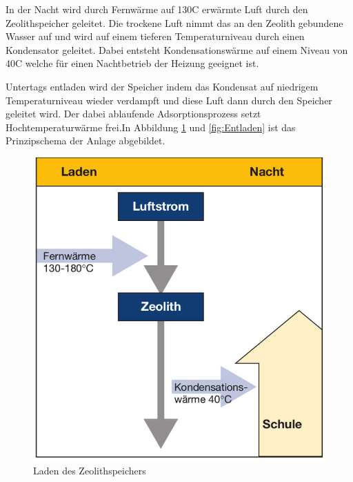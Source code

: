 \documentclass[11pt,a4paper]{scrartcl}
\begin{document}
In der Nacht wird durch Fernwärme auf 130\textdegree C erwärmte Luft durch den
Zeolithspeicher geleitet. Die trockene Luft nimmt das an den Zeolith gebundene
Wasser auf und wird auf einem tieferen Temperaturniveau durch einen Kondensator
geleitet. Dabei entsteht Kondensationswärme auf einem Niveau von 40\textdegree C
welche für einen Nachtbetrieb der Heizung geeignet ist. 

Untertags entladen wird der Speicher indem das Kondensat auf niedrigem
Temperaturniveau wieder verdampft und diese Luft dann durch den Speicher
geleitet wird. Der dabei ablaufende Adsorptionsprozess setzt Hochtemperaturwärme
frei.In Abbildung \ref{fig:Laden} und \ref{fig:Entladen} ist das Prinzipschema
der Anlage abgebildet.

\begin{figure}[h!]
\begin{center}
\includegraphics[scale=1]{images/Laden.jpg}
\caption{Laden des Zeolithspeichers \cite{BINE2}}
\label{fig:Laden}
\end{center}
\end{figure}
\end{document}
